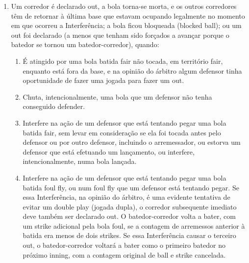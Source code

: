 \begin{multicols}{2}
\begin{enumerate}[label=\alph*)]
\begin{enumerate}[label=\roman*.]
\begin{enumerate}[label=\arabic*)]
				Uma base por \glspl{ball}, ou um terceiro \gls{strike} n\~ao agarrado em que o corredor \'e autorizado a correr, \'e tratado da mesma forma que uma bola batida. O batedor-corredor pode continuar avan\c{c}ando ap\'os ultrapassar a primeira base, e \'e autorizado a correr em dire\c{c}\~ao \`a segunda base, desde que ele n\~ao pare na primeira base. Se ele parar ap\'os ultrapassar a primeira base fazendo uma curva, ter\'a de retornar \`a base, ou continuar avan\c{c}ando \`a segunda base, imediatamente. 
			\end{enumerate}
			\item O batedor-corredor \'e declarado \gls{out} por ter interferido numa jogada no \gls{homeplate} para tentar evitar uma elimina\c{c}\~ao evidente de um corredor que est\'a avan\c{c}ando para \gls{home}. O corredor que est\'a avan\c{c}ando \'e declarado \gls{out} e os outros corredores t\^em de retornar \`a \'ultima base que estavam ocupando no momento do arremesso.
		\end{enumerate}
		\item Um corredor \'e declarado \gls{out}, a bola torna-se morta, e os outros corredores t\^em de retornar \`a \'ultima base que estavam ocupando legalmente no momento em que ocorreu a Interfer\^encia; a bola ficou bloqueada (\gls{blocked ball}); ou um \gls{out} foi declarado (a menos que tenham sido for\c{c}ados a avan\c{c}ar porque o batedor se tornou um batedor-corredor), quando: 
		\begin{enumerate}[label=\roman*.]
			\item \'E atingido por uma bola batida \gls{fair} n\~ao tocada, em territ\'orio \gls{fair}, enquanto est\'a fora da base, e na opini\~ao do \'arbitro algum defensor tinha oportunidade de fazer uma jogada para fazer um \gls{out}. 
			\item Chuta, intencionalmente, uma bola que um defensor n\~ao tenha conseguido defender. 
			\item Interfere na a\c{c}\~ao de um defensor que est\'a tentando pegar uma bola batida \gls{fair}, sem levar em considera\c{c}\~ao se ela foi tocada antes pelo defensor ou por outro defensor, incluindo o arremessador, ou estorva um defensor que est\'a efetuando um lan\c{c}amento, ou interfere, intencionalmente, numa bola lan\c{c}ada. 
			\item Interfere na a\c{c}\~ao de um defensor que est\'a tentando pegar uma bola batida \gls{foul fly}, ou num \gls{foul fly} que um defensor est\'a tentando pegar. Se essa Interfer\^encia, na opini\~ao do \'arbitro, \'e uma evidente tentativa de evitar um \gls{double play} (jogada dupla), o corredor subsequente imediato deve tamb\'em ser declarado \gls{out}. O batedor-corredor volta a bater, com um \gls{strike} adicional pela bola \gls{foul}, se a contagem de arremessos anterior \`a batida era menos de dois \glspl{strike}. Se essa Interfer\^encia causar o terceiro \gls{out}, o batedor-corredor voltar\'a a bater como o primeiro batedor no pr\'oximo \gls{inning}, com a contagem original de \gls{ball} e \gls{strike} cancelada. 
			

\end{enumerate}
\end{enumerate}
\end{multicols}
